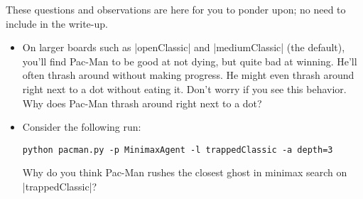 These questions and observations are here for you to ponder upon; no need to
include in the write-up.

\begin{itemize}
  \item On larger boards such as |openClassic| and |mediumClassic| (the
  default), you'll find Pac-Man to be good at not dying, but quite bad at
  winning. He'll often thrash around without making progress. He might even
  thrash around right next to a dot without eating it. Don't worry if you see
  this behavior. Why does Pac-Man thrash around right next to a dot?

  \item Consider the following run:

  \begin{lstlisting}
python pacman.py -p MinimaxAgent -l trappedClassic -a depth=3
\end{lstlisting}

  Why do you think Pac-Man rushes the closest ghost in minimax search on
  |trappedClassic|?



\end{itemize}
